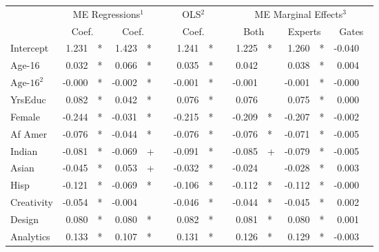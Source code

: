 \documentclass[12pt]{article}
\theoremstyle{definition}
\begin{document}
\begin{landscape}
\begin{table}
\begin{threeparttable}
\begin{tabular}[l]{l r l r l c r l c r l r l r l}
  \cmidrule{1-15}
  & \multicolumn{4}{c}{ME Regressions$^{1}$} &&  \multicolumn{2}{c}{OLS$^{2}$} && \multicolumn{6}{c}{ME Marginal Effects$^{3}$} \\
  \cmidrule(l){2-5}    \cmidrule(l){7-8}     \cmidrule(l){10-15}
  & \multicolumn{2}{c}{Coef.} &  \multicolumn{2}{c}{Coef.}  && \multicolumn{2}{c}{Coef.} && \multicolumn{2}{c}{Both}    &  \multicolumn{2}{c}{Experts}  &  \multicolumn{2}{c}{Gates} \\
                  \cmidrule(l){2-3} \cmidrule(l){4-5} \cmidrule(l){7-8} \cmidrule(l){10-11} \cmidrule(l){12-13} \cmidrule(l){14-15}
  Intercept              &  1.231 & *      &  1.423 & *     &&  1.241 & *     &&  1.225 & *        &  1.260 & *        & -0.040 &        \\
  Age-16                 &  0.032 & *      &  0.066 & *     &&  0.035 & *     &&  0.042 &          &  0.038 & *        &  0.004 &        \\
  $\textrm{Age-16}^{2}$  & -0.000 & *      & -0.002 & *     && -0.001 & *     && -0.001 &          & -0.001 & *        & -0.000 &        \\
  YrsEduc                &  0.082 & *      &  0.042 & *     &&  0.076 & *     &&  0.076 &          &  0.075 & *        &  0.000 &        \\
  Female                 & -0.244 & *      & -0.031 & *     && -0.215 & *     && -0.209 & *        & -0.207 & *        & -0.002 &        \\
  Af Amer                & -0.076 & *      & -0.044 & *     && -0.076 & *     && -0.076 & *        & -0.071 & *        & -0.005 &        \\
  Indian                 & -0.081 & *      & -0.069 & +     && -0.091 & *     && -0.085 & +        & -0.079 & *        & -0.005 &        \\
  Asian                  & -0.045 & *      &  0.053 & +     && -0.032 & *     && -0.024 &          & -0.028 & *        &  0.003 &        \\
  Hisp                   & -0.121 & *      & -0.069 & *     && -0.106 & *     && -0.112 & *        & -0.112 & *        & -0.000 &        \\
  Creativity             & -0.054 & *      & -0.004 &       && -0.046 & *     && -0.044 & *        & -0.045 & *        &  0.002 &        \\
  Design                 &  0.080 & *      &  0.080 & *     &&  0.082 & *     &&  0.081 & *        &  0.080 & *        &  0.001 &        \\
  Analytics              &  0.133 & *      &  0.107 & *     &&  0.131 & *     &&  0.126 & *        &  0.129 & *        & -0.003 &        \\

\end{tabular}
\end{threeparttable}
\end{table}
\end{landscape}
\end{document}
